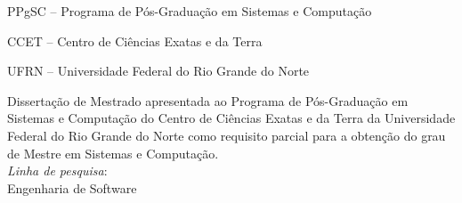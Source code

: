 
\titulo{\Large{\mscThesisTitle}}
\autor{\author}
\orientador[Orientador]{\par \advisor}
\coorientador[Coorientador]{\par \coadvisor}
\instituicao
{
	PPgSC -- Programa de Pós-Graduação em Sistemas e Computação\par 
   CCET -- Centro de Ciências Exatas e da Terra\par
   UFRN -- Universidade Federal do Rio Grande do Norte
}
	
\comentario
{
	Dissertação de Mestrado apresentada ao Programa de Pós-Graduação em Sistemas e Computação do Centro de Ciências Exatas e da Terra da Universidade Federal do Rio Grande do Norte como requisito parcial para a obtenção do grau de Mestre em Sistemas e Computação.\bigskip\\
   \textit{Linha de pesquisa}:\\Engenharia de Software
}
		
\local{\city}
\data{\date}
	
\folhaderosto